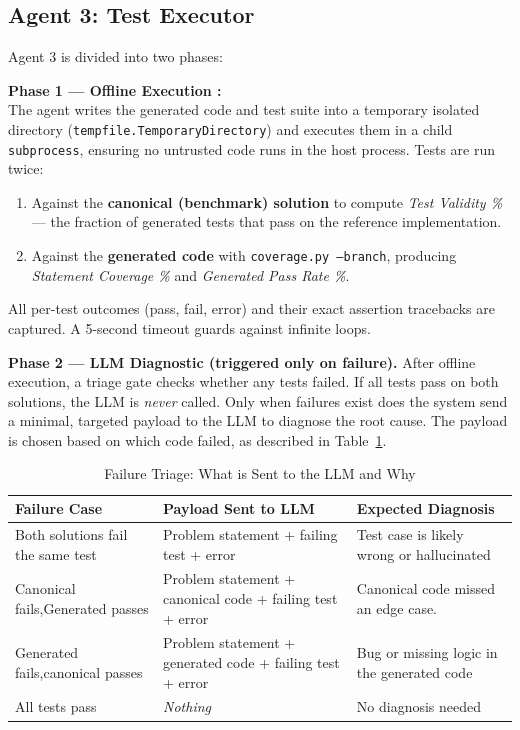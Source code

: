 \documentclass[12pt, a4paper]{article}
\begin{document}
\subsection{Agent 3: Test Executor}

Agent 3 is divided into two phases:

\textbf{Phase 1 --- Offline Execution :}\\
The agent writes the generated code and test suite into a temporary isolated
directory (\texttt{tempfile.TemporaryDirectory}) and executes them in a child
\texttt{subprocess}, ensuring no untrusted code runs in the host process.
Tests are run twice:

\begin{enumerate}
  \item Against the \textbf{canonical (benchmark) solution} to compute
        \emph{Test Validity \%} --- the fraction of generated tests that pass
        on the reference implementation.
  \item Against the \textbf{generated code} with \texttt{coverage.py
        --branch}, producing \emph{Statement Coverage \%} and
        \emph{Generated Pass Rate \%}.
\end{enumerate}

All per-test outcomes (pass, fail, error) and their exact assertion tracebacks
are captured. A 5-second timeout guards against infinite loops.

\textbf{Phase 2 --- LLM Diagnostic (triggered only on failure).}
After offline execution, a triage gate checks whether any tests failed.
If all tests pass on both solutions, the LLM is \emph{never} called. Only when failures exist does the system send a minimal,
targeted payload to the LLM to diagnose the root cause. The payload is
chosen based on which code failed, as described in
Table~\ref{tab:triage}.


\begin{table}[H]
\centering
\caption{Failure Triage: What is Sent to the LLM and Why}
\label{tab:triage}
\begin{tabular}{>{\raggedright}p{40mm} >{\raggedright}p{58mm} >{\raggedright\arraybackslash}p{42mm}}
\toprule
\rowcolor{AccentA!10}
\textbf{Failure Case} & \textbf{Payload Sent to LLM} & \textbf{Expected Diagnosis} \\
\midrule
Both solutions fail the same test &
  Problem statement + failing test + error &
  Test case is likely wrong or hallucinated \\
\addlinespace
Canonical fails,\newline Generated passes &
  Problem statement + canonical code + failing test + error &
  Canonical code missed an edge case. \\
\addlinespace
Generated fails,\newline canonical passes &
  Problem statement + generated code + failing test + error &
  Bug or missing logic in the generated code \\
\addlinespace
All tests pass &
  \emph{Nothing} &
  No diagnosis needed \\
\bottomrule
\end{tabular}
\end{table}
\end{document}
